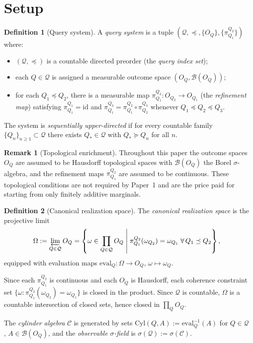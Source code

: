 \documentclass[11pt]{article}
\theoremstyle{definition}
\newtheorem{definition}{Definition}
\newtheorem{remark}{Remark}
\newcommand{\Qcal}{\mathcal{Q}}
\newcommand{\Bcal}{\mathcal{B}}
\newcommand{\Ccal}{\mathcal{C}}
\begin{document}
\section{Setup}\label{sec:setup}

\begin{definition}[Query system]
A \emph{query system} is a tuple $(\Qcal, \preceq, \{O_Q\},
\{\pi^{Q_2}_{Q_1}\})$ where:
\begin{itemize}
\item $(\Qcal, \preceq)$ is a countable directed preorder (the
  \emph{query index set});
\item each $Q \in \Qcal$ is assigned a measurable outcome space
  $(O_Q, \Bcal(O_Q))$;
\item for each $Q_1 \preceq Q_2$, there is a measurable map
  $\pi^{Q_2}_{Q_1} : O_{Q_2} \to O_{Q_1}$ (the
  \emph{refinement map}) satisfying $\pi^{Q_1}_{Q_1} = \mathrm{id}$
  and $\pi^{Q_3}_{Q_1} = \pi^{Q_2}_{Q_1} \circ \pi^{Q_3}_{Q_2}$
  whenever $Q_1 \preceq Q_2 \preceq Q_3$.
\end{itemize}
The system is \emph{sequentially upper-directed} if for every
countable family $\{Q_n\}_{n \ge 1} \subset \Qcal$ there exists
$Q_* \in \Qcal$ with $Q_* \succeq Q_n$ for all $n$.
\end{definition}

\begin{remark}[Topological enrichment]
Throughout this paper the outcome spaces $O_Q$ are assumed to be
Hausdorff topological spaces with $\Bcal(O_Q)$ the Borel
$\sigma$-algebra, and the refinement maps $\pi^{Q_2}_{Q_1}$ are
assumed to be continuous.  These topological conditions are not
required by Paper~1 and are the price paid for starting from only
finitely additive marginals.
\end{remark}

\begin{definition}[Canonical realization space]
The \emph{canonical realization space} is the projective limit
\[
\Omega
:=
\varprojlim_{Q \in \Qcal} O_Q
=
\left\{
\omega \in \prod_{Q \in \Qcal} O_Q
\;\middle|\;
\pi^{Q_2}_{Q_1}(\omega_{Q_2}) = \omega_{Q_1}
\;\forall\, Q_1 \preceq Q_2
\right\},
\]
equipped with evaluation maps $\mathrm{eval}_Q : \Omega \to O_Q$,
$\omega \mapsto \omega_Q$.

Since each $\pi^{Q_2}_{Q_1}$ is continuous and each $O_Q$ is
Hausdorff, each coherence constraint set
$\{\omega : \pi^{Q_2}_{Q_1}(\omega_{Q_2}) = \omega_{Q_1}\}$ is
closed in the product.  Since $\Qcal$ is countable, $\Omega$ is a
countable intersection of closed sets, hence closed in
$\prod_Q O_Q$.

The \emph{cylinder algebra} $\Ccal$ is generated by sets
$\mathrm{Cyl}(Q, A) := \mathrm{eval}_Q^{-1}(A)$ for $Q \in \Qcal$,
$A \in \Bcal(O_Q)$, and the \emph{observable $\sigma$-field} is
$\sigma(\Qcal) := \sigma(\Ccal)$.
\end{definition}
\end{document}
